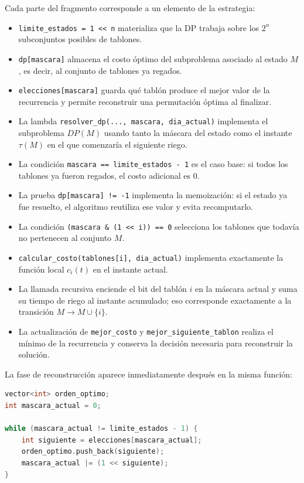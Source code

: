 \documentclass[12pt,a4paper]{article}
\newcommand{\cost}[1]{c_{#1}}
\begin{document}
Cada parte del fragmento corresponde a un elemento de la estrategia:
\begin{itemize}
  \item \verb|limite_estados = 1 << n| materializa que la DP trabaja sobre los \(2^n\) subconjuntos posibles de tablones.
  \item \texttt{dp[mascara]} almacena el costo \'optimo del subproblema asociado al estado \(M\), es decir, al conjunto de tablones ya regados.
  \item \texttt{elecciones[mascara]} guarda qu\'e tabl\'on produce el mejor valor de la recurrencia y permite reconstruir una permutaci\'on \'optima al finalizar.
  \item La lambda \texttt{resolver\_dp(..., mascara, dia\_actual)} implementa el subproblema \(DP(M)\) usando tanto la m\'ascara del estado como el instante \(\tau(M)\) en el que comenzar\'ia el siguiente riego.
  \item La condici\'on \verb|mascara == limite_estados - 1| es el caso base: si todos los tablones ya fueron regados, el costo adicional es \(0\).
  \item La prueba \verb|dp[mascara] != -1| implementa la memoizaci\'on: si el estado ya fue resuelto, el algoritmo reutiliza ese valor y evita recomputarlo.
  \item La condici\'on \verb|(mascara & (1 << i)) == 0| selecciona los tablones que todav\'ia no pertenecen al conjunto \(M\).
  \item \texttt{calcular\_costo(tablones[i], dia\_actual)} implementa exactamente la funci\'on local \(\cost{i}(t)\) en el instante actual.
  \item La llamada recursiva enciende el bit del tabl\'on \(i\) en la m\'ascara actual y suma su tiempo de riego al instante acumulado; eso corresponde exactamente a la transici\'on \(M \to M \cup \{i\}\).
  \item La actualizaci\'on de \texttt{mejor\_costo} y \texttt{mejor\_siguiente\_tablon} realiza el m\'inimo de la recurrencia y conserva la decisi\'on necesaria para reconstruir la soluci\'on.
\end{itemize}

La fase de reconstrucci\'on aparece inmediatamente despu\'es en la misma funci\'on:

\begin{lstlisting}[style=bloquecodigo,language=C++]
vector<int> orden_optimo;
int mascara_actual = 0;

while (mascara_actual != limite_estados - 1) {
    int siguiente = elecciones[mascara_actual];
    orden_optimo.push_back(siguiente);
    mascara_actual |= (1 << siguiente);
}
\end{lstlisting}
\end{document}
